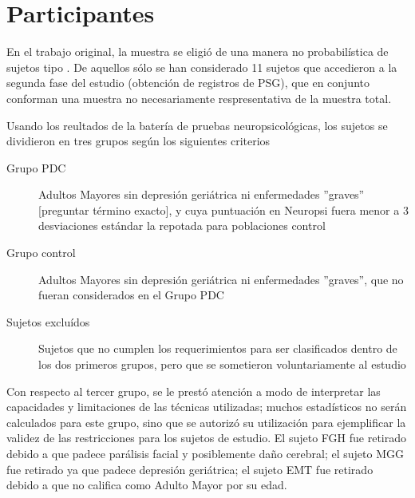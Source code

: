 
\section{Participantes}

En el trabajo original,
la muestra se eligi\'o de una manera no probabilística de sujetos tipo \cite{Garcia09}. De aquellos
s\'olo se han considerado 11 sujetos que accedieron a la segunda fase del estudio (obtenci\'on
de registros de PSG), que en conjunto conforman una muestra no necesariamente respresentativa de
la muestra total.

Usando los reultados de la bater\'ia de pruebas neuropsicol\'ogicas, los sujetos se dividieron
en tres grupos seg\'un los siguientes criterios
\begin{description}
\item[Grupo PDC] Adultos Mayores sin depresi\'on geri\'atrica %
ni enfermedades ''graves'' [preguntar t\'ermino exacto],
y cuya puntuaci\'on en Neuropsi fuera menor a 3 desviaciones est\'andar la repotada para poblaciones
control \cite{Solis03}
\item[Grupo control] Adultos Mayores sin depresi\'on geri\'atrica ni enfermedades ''graves'',
que no fueran considerados en el Grupo PDC
\item[Sujetos exclu\'idos] Sujetos que no cumplen los requerimientos para ser clasificados dentro de
los dos primeros grupos, pero que se sometieron voluntariamente al estudio
\end{description}
Con respecto al tercer grupo, se le prest\'o atenci\'on a modo de interpretar las capacidades y
limitaciones de las t\'ecnicas utilizadas; muchos estad\'isticos no ser\'an calculados para este
grupo,
sino que se autoriz\'o su utilizaci\'on
para ejemplificar la validez de las restricciones para los sujetos de estudio. El sujeto 
FGH fue retirado debido a que padece par\'alisis facial y posiblemente da\~no cerebral; el sujeto MGG
fue retirado ya que padece depresi\'on geri\'atrica; el sujeto EMT fue retirado debido a que no
califica como Adulto Mayor por su edad.


